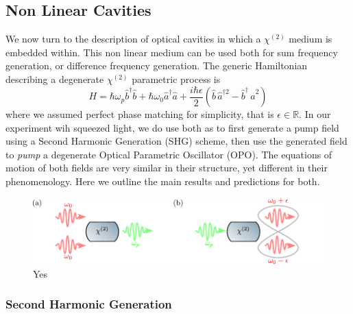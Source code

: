 \subsection{Non Linear Cavities}
We now turn to the description of optical cavities in which a $\chi^{(2)}$ medium is embedded within. This non linear medium can be used both for sum frequency generation, or difference frequency generation. The generic Hamiltonian describing a  degenerate $\chi^{(2)}$ parametric process is 
\begin{equation}
  H = \hbar \omega_p \hat{b}^{\dagger}\hat{b} + \hbar \omega_0 \hat{a}^\dagger \hat{a} + \frac{i\hbar\epsilon}{2}( \hat{b} \, \hat{a}^{\dagger2} - \hat{b}^\dagger \, \hat{a}^2)
\end{equation}
where we assumed perfect phase matching for simplicity, that is $\epsilon \in\mathbb{R}$. In our experiment wih squeezed light, we do use both as to first generate a pump field using a Second Harmonic Generation (SHG) scheme, then use the generated field to \textit{pump} a degenerate Optical Parametric Oscillator (OPO). The equations of motion of both fields are very similar in their structure, yet different in their phenomenology. Here we outline the main results and predictions for both. 
\begin{figure}
\centering
\includegraphics[width=\textwidth]{./chap2/fig/schema_SHG_OPO_2photons.pdf}
\caption{Yes} 
\end{figure}


\subsubsection{Second Harmonic Generation}

